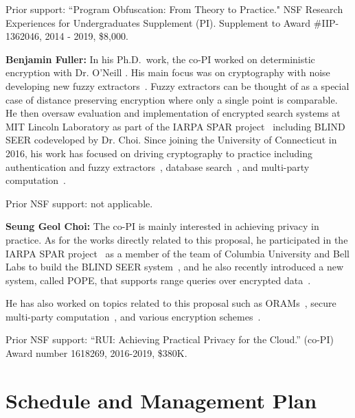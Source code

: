 \documentclass[11pt]{article}
\theoremstyle{remark}
\begin{document}
Prior support: ``Program Obfuscation: From Theory to Practice." NSF Research Experiences for Undergraduates Supplement (PI).
Supplement to Award \#IIP-1362046,   2014 - 2019, \$8,000.

\textbf{Benjamin Fuller:}
In his Ph.D.~work, the co-PI worked on deterministic encryption with Dr. O'Neill \cite{TCC:FulNeiRey12,JC:FulONeRey15}.  His main focus was on cryptography with noise developing new fuzzy extractors~\cite{AC:FulMenRey13,AC:FulReySmi16,EC:CFPRS16}.  Fuzzy extractors can be thought of as a special case of distance preserving encryption where only a single point is comparable.  He then oversaw evaluation and implementation of encrypted search systems at MIT Lincoln Laboratory as part of the IARPA SPAR project~\cite{spar_baa} including BLIND SEER codeveloped by Dr. Choi.  Since joining the University of Connecticut in 2016, his work has focused on driving cryptography to practice including authentication and fuzzy extractors~\cite{EPRINT:HFDD17,EPRINT:BKFY17,EPRINT:ABCFG16}, database search~\cite{SP:FVYSHG17}, and multi-party computation~\cite{EPRINT:CunFulYak16}.  

Prior NSF support: not applicable.

\textbf{Seung Geol Choi:}
The co-PI is mainly interested in achieving privacy in practice. As for the
works directly related to this proposal, he participated in the IARPA SPAR
project~\cite{spar_baa} as a member of the team of Columbia University and Bell
Labs to build the BLIND SEER system~\cite{SP:PKVKMC14}, and he also recently
introduced a new system, called POPE, that supports range queries over
encrypted data~\cite{CCS:RACY16}.  

He has also worked on topics related to this proposal such as
ORAMs~\cite{SP:RocAviCho16,NDSS:ACMR17,CCS:RACM17}, secure multi-party
computation~\cite{AC:CEJMY07,TCC:CDMW09,AC:CEMY09,RSA:CHKMR12,TCC:CKKZ12,PKC:CKWZ13,C:CKMZ14,TCC:CKSYZ14},
and various encryption schemes~\cite{TCC:CDMW08,AC:CDMW09,AC:LCLPY13}. 

Prior NSF support: ``RUI: Achieving Practical Privacy for the Cloud.'' (co-PI) Award number 1618269, 2016-2019, \$380K. 

\section{Schedule and Management Plan}



\end{document}
